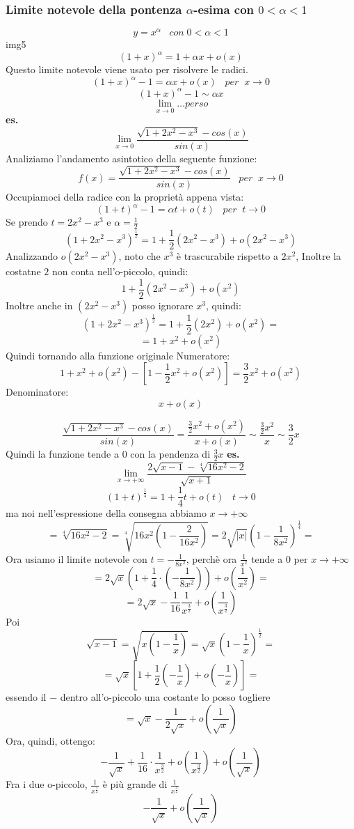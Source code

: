 \subsubsection*{Limite notevole della pontenza $\alpha$-esima con $0<\alpha<1$}
\[
    y = x^{\alpha} \;\;\; con \;0<\alpha<1
\] 
img5
\newline
\[
    (1+x)^{\alpha} = 1+\alpha x + o(x)
\]
Questo limite notevole viene usato per risolvere le radici.
\[
    (1+x)^{\alpha} -1 = \alpha x +o(x) \;\;\; per \;\; x \rightarrow 0
\]
\[
    (1+x)^{\alpha} -1 \sim \alpha x
\]
\[
    \lim_{x \rightarrow 0} \dots perso
\]
\textbf{es.} 
\[
    \lim_{x\rightarrow 0} \frac{\sqrt{1+2x^2-x^3}-cos(x)}{sin(x)}
\]
Analiziamo l'andamento asintotico della seguente funzione:
\[
    f(x) = \frac{\sqrt{1+2x^2-x^3}-cos(x)}{sin(x)} \;\;\; per \;\; x \rightarrow 0
\]
Occupiamoci della radice con la proprietà appena vista:
\[
    (1+t)^{\alpha} -1 = \alpha t +o(t) \;\;\; per \;\; t \rightarrow 0
\]
Se prendo $t = 2x^2 -x^3$ e $\alpha = \frac{1}{2}$
\[
    (1+2x^2-x^3)^{\frac{1}{2}} = 1 + \frac{1}{2} (2x^2-x^3) + o(2x^2 - x^3)
\]
Analizzando $o(2x^2 - x^3)$, noto che $x^3$ è trascurabile rispetto a $2x^2$, Inoltre la costatne $2$ non conta nell'o-piccolo, quindi:
\[
    1 + \frac{1}{2} (2x^2-x^3) + o(x^2)
\]
Inoltre anche in $(2x^2-x^3)$ posso ignorare $x^3$, quindi:
\[
    (1+2x^2-x^3)^{\frac{1}{2}} = 1 + \frac{1}{2} (2x^2) + o(x^2) =
\]
\[
    = 1 + x^2 + o(x^2)
\]
Quindi tornando alla funzione originale
\newline
Numeratore:
\[
    1 + x^2 + o(x^2) -[1-\frac{1}{2}x^2 +o(x^2)]= \frac{3}{2}x^2 +o(x^2)
\]
Denominatore:
\[
    x+o(x)
\]

\[
    \frac{\sqrt{1+2x^2-x^3}-cos(x)}{sin(x)} = \frac{\frac{3}{2}x^2 +o(x^2)}{x+o(x)} \sim \frac{\frac{3}{2}x^2}{x} \sim \frac{3}{2}x
\]
Quindi la funzione tende a $0$ con la pendenza di $\frac{3}{2}x$
\newline
\newline
\textbf{es.} 
\[
    \lim_{x\rightarrow + \infty} \frac{2\sqrt{x-1}-\sqrt[4]{16x^2-2}}{\sqrt{x+1}}
\]
\[
    (1+t)^{\frac{1}{4}} = 1+\frac{1}{4}t +o(t) \;\;\; t \rightarrow 0
\]
ma noi nell'espressione della consegna abbiamo $x\rightarrow + \infty$
\[
    = \sqrt[4]{16x^2-2} = \sqrt[4]{16x^2(1-\frac{2}{16x^2})} = 2 \sqrt{|x|} (1- \frac{1}{8x^2})^{\frac{1}{4}} = 
\]
Ora usiamo il limite notevole con $t = -\frac{1}{8x^2}$, perchè ora $\frac{1}{x^2}$ tende a $0$ per $x\rightarrow + \infty$
\[
    = 2\sqrt{x}(1+\frac{1}{4} \cdot (-\frac{1}{8x^2})) + o(\frac{1}{x^2}) =
\]
\[
    = 2 \sqrt{x} - \frac{1}{16} \frac{1}{x^{\frac{3}{2}}} + o(\frac{1}{x^{\frac{3}{2}}})
\]
Poi
\[
    \sqrt{x-1} = \sqrt{x(1-\frac{1}{x})} = \sqrt{x} (1-\frac{1}{x})^{\frac{1}{2}} =
\]
\[
    =\sqrt{x}[ 1 + \frac{1}{2} (-\frac{1}{x}) + o(-\frac{1}{x}) ] = 
\]
essendo il $-$ dentro all'o-piccolo una costante lo posso togliere
\[
    =\sqrt{x}  - \frac{1}{2\sqrt{x}}  + o(\frac{1}{\sqrt{x}}) 
\]
Ora, quindi, ottengo:
\[
    -\frac{1}{\sqrt{x}} + \frac{1}{16} \cdot \frac{1}{x^{\frac{3}{2}}} + o(\frac{1}{x^{\frac{3}{2}}}) + o(\frac{1}{\sqrt{x}})
\]
Fra i due o-piccolo, $\frac{1}{x^{\frac{1}{2}}}$ è più grande di $\frac{1}{x^{\frac{3}{2}}}$
\[
    -\frac{1}{\sqrt{x}} + o(\frac{1}{\sqrt{x}})
\]